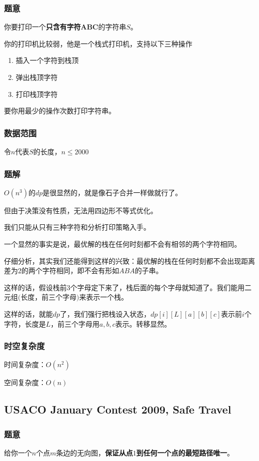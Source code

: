 \documentclass{ctexart}
\begin{document}
\subsubsection{题意}
你要打印一个\textbf{只含有字符ABC}的字符串$S$。

你的打印机比较弱，他是一个栈式打印机，支持以下三种操作
\begin{enumerate}
\item 插入一个字符到栈顶
\item 弹出栈顶字符
\item 打印栈顶字符
\end{enumerate}

要你用最少的操作次数打印字符串。
\subsubsection{数据范围}
令$n$代表$S$的长度，$n \le 2000$
\subsubsection{题解}
$O(n^3)$的$dp$是很显然的，就是像石子合并一样做就行了。

但由于决策没有性质，无法用四边形不等式优化。

我们只能从只有三种字符和分析打印策略入手。

一个显然的事实是说，最优解的栈在任何时刻都不会有相邻的两个字符相同。

仔细分析，其实我们还能得到这样的兴致：最优解的栈在任何时刻都不会出现距离差为$2$的两个字符相同，即不会有形如$ABA$的子串。

这样的话，假设栈前$3$个字母定下来了，栈后面的每个字母就知道了。我们能用二元组$($长度，前三个字母$)$来表示一个栈。

这样的话，就能$dp$了，我们强行把栈设入状态，$dp[i][L][a][b][c]$表示前$i$个字符，长度是$L$，前三个字母用$a,b,c$表示。转移显然。
\subsubsection{时空复杂度}
时间复杂度：$O(n^2)$

空间复杂度：$O(n)$
\subsection{USACO January Contest 2009, Safe Travel}
\subsubsection{题意}
给你一个$n$个点$m$条边的无向图，\textbf{保证从点$1$到任何一个点的最短路径唯一}。
\end{document}
